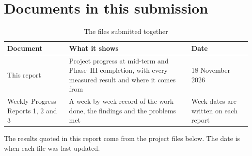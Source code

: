 \section*{Documents in this submission}

\begin{table}[H]
\centering
\caption{The files submitted together}
\label{tab:documents}
\tabfont
\begin{tabularx}{\textwidth}{@{}p{4.1cm}Yp{3.3cm}@{}}
\toprule
\textbf{Document} & \textbf{What it shows} & \textbf{Date} \\
\midrule
This report & Project progress at mid-term and Phase~III completion, with every measured result and where it comes from & 18 November 2026 \\
Weekly Progress Reports 1, 2 and 3 & A week-by-week record of the work done, the findings and the problems met & Week dates are written on each report \\
\bottomrule
\end{tabularx}
\end{table}

The results quoted in this report come from the project files below. The date is when
each file was last updated.

